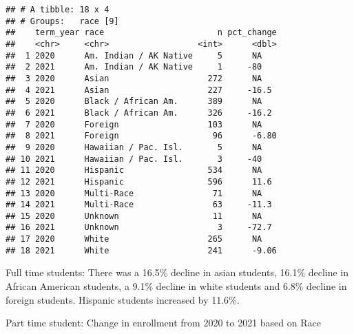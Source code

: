 \documentclass[]{article}
\newenvironment{Shaded}{\begin{snugshade}}{\end{snugshade}}
\newcommand{\CommentTok}[1]{\textcolor[rgb]{0.56,0.35,0.01}{\textit{#1}}}
\newcommand{\DataTypeTok}[1]{\textcolor[rgb]{0.13,0.29,0.53}{#1}}
\newcommand{\DecValTok}[1]{\textcolor[rgb]{0.00,0.00,0.81}{#1}}
\newcommand{\KeywordTok}[1]{\textcolor[rgb]{0.13,0.29,0.53}{\textbf{#1}}}
\newcommand{\NormalTok}[1]{#1}
\newcommand{\OperatorTok}[1]{\textcolor[rgb]{0.81,0.36,0.00}{\textbf{#1}}}
\newcommand{\OtherTok}[1]{\textcolor[rgb]{0.56,0.35,0.01}{#1}}
\newcommand{\StringTok}[1]{\textcolor[rgb]{0.31,0.60,0.02}{#1}}
\begin{document}
\begin{verbatim}
## # A tibble: 18 x 4
## # Groups:   race [9]
##    term_year race                       n pct_change
##    <chr>     <chr>                  <int>      <dbl>
##  1 2020      Am. Indian / AK Native     5      NA   
##  2 2021      Am. Indian / AK Native     1     -80   
##  3 2020      Asian                    272      NA   
##  4 2021      Asian                    227     -16.5 
##  5 2020      Black / African Am.      389      NA   
##  6 2021      Black / African Am.      326     -16.2 
##  7 2020      Foreign                  103      NA   
##  8 2021      Foreign                   96      -6.80
##  9 2020      Hawaiian / Pac. Isl.       5      NA   
## 10 2021      Hawaiian / Pac. Isl.       3     -40   
## 11 2020      Hispanic                 534      NA   
## 12 2021      Hispanic                 596      11.6 
## 13 2020      Multi-Race                71      NA   
## 14 2021      Multi-Race                63     -11.3 
## 15 2020      Unknown                   11      NA   
## 16 2021      Unknown                    3     -72.7 
## 17 2020      White                    265      NA   
## 18 2021      White                    241      -9.06
\end{verbatim}

Full time students: There was a 16.5\% decline in asian students, 16.1\%
decline in African American students, a 9.1\% decline in white students
and 6.8\% decline in foreign students. Hispanic students increased by
11.6\%.

Part time student: Change in enrollment from 2020 to 2021 based on Race

\begin{Shaded}
\end{Shaded}
\end{document}

